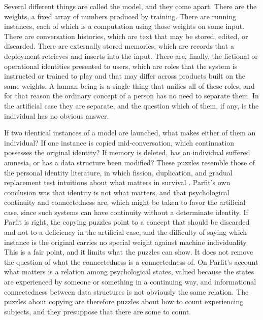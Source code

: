 \documentclass[12pt]{article}
\theoremstyle{definition}
\begin{document}
Several different things are called the model, and they come apart. There are the weights, a fixed array of numbers produced by training. There are running instances, each of which is a computation using those weights on some input. There are conversation histories, which are text that may be stored, edited, or discarded. There are externally stored memories, which are records that a deployment retrieves and inserts into the input. There are, finally, the fictional or operational identities presented to users, which are roles that the system is instructed or trained to play and that may differ across products built on the same weights. A human being is a single thing that unifies all of these roles, and for that reason the ordinary concept of a person has no need to separate them. In the artificial case they are separate, and the question which of them, if any, is the individual has no obvious answer.

If two identical instances of a model are launched, what makes either of them an individual? If one instance is copied mid-conversation, which continuation possesses the original identity? If memory is deleted, has an individual suffered amnesia, or has a data structure been modified? These puzzles resemble those of the personal identity literature, in which fission, duplication, and gradual replacement test intuitions about what matters in survival \cite{parfit1984}. Parfit's own conclusion was that identity is not what matters, and that psychological continuity and connectedness are, which might be taken to favor the artificial case, since such systems can have continuity without a determinate identity. If Parfit is right, the copying puzzles point to a concept that should be discarded and not to a deficiency in the artificial case, and the difficulty of saying which instance is the original carries no special weight against machine individuality. This is a fair point, and it limits what the puzzles can show. It does not remove the question of what the connectedness is a connectedness of. On Parfit's account what matters is a relation among psychological states, valued because the states are experienced by someone or something in a continuing way, and informational connectedness between data structures is not obviously the same relation. The puzzles about copying are therefore puzzles about how to count experiencing subjects, and they presuppose that there are some to count.
\end{document}
